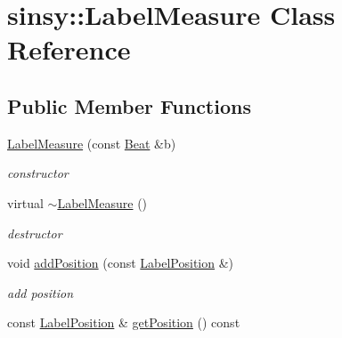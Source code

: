 \hypertarget{classsinsy_1_1LabelMeasure}{\section{sinsy\-:\-:\-Label\-Measure \-Class \-Reference}
\label{classsinsy_1_1LabelMeasure}
}
\subsection*{\-Public \-Member \-Functions}
\begin{DoxyCompactItemize}
\item 
\hypertarget{classsinsy_1_1LabelMeasure_ad780a2297ee5784a5c790c520f682702}{\hyperlink{classsinsy_1_1LabelMeasure_ad780a2297ee5784a5c790c520f682702}{\-Label\-Measure} (const \hyperlink{classsinsy_1_1Beat}{\-Beat} \&b)}\label{classsinsy_1_1LabelMeasure_ad780a2297ee5784a5c790c520f682702}

\begin{DoxyCompactList}\small\item\em constructor \end{DoxyCompactList}\item 
\hypertarget{classsinsy_1_1LabelMeasure_abb53c4d1bf440d1e4eceafaedf40291c}{virtual \hyperlink{classsinsy_1_1LabelMeasure_abb53c4d1bf440d1e4eceafaedf40291c}{$\sim$\-Label\-Measure} ()}\label{classsinsy_1_1LabelMeasure_abb53c4d1bf440d1e4eceafaedf40291c}

\begin{DoxyCompactList}\small\item\em destructor \end{DoxyCompactList}\item 
\hypertarget{classsinsy_1_1LabelMeasure_a1b1d02be7c077632a4b5ec957d0accf6}{void \hyperlink{classsinsy_1_1LabelMeasure_a1b1d02be7c077632a4b5ec957d0accf6}{add\-Position} (const \hyperlink{classsinsy_1_1LabelPosition}{\-Label\-Position} \&)}\label{classsinsy_1_1LabelMeasure_a1b1d02be7c077632a4b5ec957d0accf6}

\begin{DoxyCompactList}\small\item\em add position \end{DoxyCompactList}\item 
\hypertarget{classsinsy_1_1LabelMeasure_a590b720a524ad907302d97d91faf8d1d}{const \hyperlink{classsinsy_1_1LabelPosition}{\-Label\-Position} \& \hyperlink{classsinsy_1_1LabelMeasure_a590b720a524ad907302d97d91faf8d1d}{get\-Position} () const }\label{classsinsy_1_1LabelMeasure_a590b720a524ad907302d97d91faf8d1d}


\end{DoxyCompactItemize}
